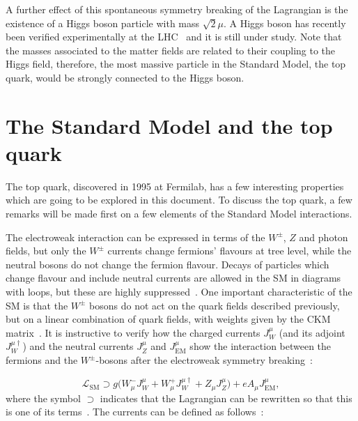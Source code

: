 A further effect of this spontaneous symmetry breaking of the Lagrangian is the existence of a Higgs boson particle with mass $\sqrt{2} \mu$.
A Higgs boson has recently been verified experimentally at the LHC~\cite{higgs_atlas,higgs_cms} and it is still under study.
Note that the masses associated to the matter fields are related to their coupling to the Higgs field, therefore, the most massive particle
in the Standard Model, the top quark, would be strongly connected to the Higgs boson.

\section{The Standard Model and the top quark}

The top quark, discovered in 1995 at Fermilab, has a few interesting properties which are going to be explored in this document. To discuss the top quark, a few
remarks will be made first on a few elements of the Standard Model interactions.

The electroweak interaction can be expressed in terms of the $W^{\pm}$, $Z$ and photon fields, but only the $W^{\pm}$ currents change fermions'
flavours at tree level, while the neutral bosons do not change the fermion flavour. Decays of particles which change flavour
and include neutral currents are allowed in the SM in diagrams with loops, but these are highly suppressed~\cite{gim}.
One important characteristic of the SM is that the $W^{\pm}$ bosons do not act on the quark fields described previously, but on
a linear combination of quark fields, with weights given by the CKM matrix~\cite{cabbibo,kobayashi,smsummary}.
It is instructive to verify how the charged currents $J^{\mu}_W$ (and its adjoint $J^{\mu \dagger}_W$) and the neutral currents $J^\mu_Z$ and $J^\mu_{\textrm{EM}}$
show the interaction between the fermions and the $W^{\pm}$-bosons
after the electroweak symmetry breaking~\cite{qft,smsummary}:

\begin{equation}
\displaystyle
\mathcal{L}_{\textrm{SM}} \supset g \Big( W_\mu^- J^{\mu}_W + W_\mu^+ J^{\mu \dagger}_W + Z_\mu J_Z^\mu \Big) + e A_\mu J^\mu_{\textrm{EM}},
\label{eq:w_int}
\end{equation}
where the symbol $\supset$ indicates that the Lagrangian can be rewritten so that this is one of its terms~\cite{qft}.
The currents can be defined as follows~\cite{qft}:

